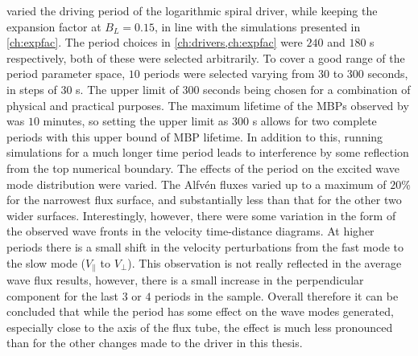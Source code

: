  varied the driving period of the logarithmic spiral driver, while keeping the expansion factor at $B_L = 0.15$, in line with the simulations presented in \cref{ch:expfac}.
The period choices in \cref{ch:drivers,ch:expfac} were $240$ and $180$ s respectively, both of these were selected arbitrarily.
To cover a good range of the period parameter space, $10$ periods were selected varying from $30$ to $300$ seconds, in steps of $30$ s.
The upper limit of $300$ seconds being chosen for a combination of physical and practical purposes.
The maximum lifetime of the MBPs observed by \cite{sanchezalmeida2004} was $10$ minutes, so setting the upper limit as $300$ s allows for two complete periods with this upper bound of MBP lifetime.
In addition to this, running simulations for a much longer time period leads to interference by some reflection from the top numerical boundary.
The effects of the period on the excited wave mode distribution were varied.
The Alfv\'en fluxes varied up to a maximum of $20$\% for the narrowest flux surface, and substantially less than that for the other two wider surfaces.
Interestingly, however, there were some variation in the form of the observed wave fronts in the velocity time-distance diagrams.
At higher periods there is a small shift in the velocity perturbations from the fast mode to the slow mode ($V_\parallel$ to $V_\perp$).
This observation is not really reflected in the average wave flux results, however, there is a small increase in the perpendicular component for the last $3$ or $4$ periods in the sample.
Overall therefore it can be concluded that while the period has some effect on the wave modes generated, especially close to the axis of the flux tube, the effect is much less pronounced than for the other changes made to the driver in this thesis.

